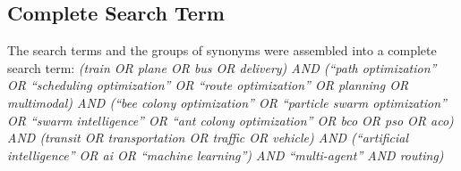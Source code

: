 
\subsection{Complete Search Term}
\label{searchterm}
The search terms and the groups of synonyms were assembled into a complete search term:
\newline
\textit{(train OR plane OR bus OR delivery) AND (``path optimization'' OR ``scheduling optimization'' OR ``route optimization'' OR planning OR multimodal) AND (``bee colony optimization'' OR ``particle swarm optimization'' OR ``swarm intelligence'' OR ``ant colony optimization'' OR bco OR pso OR aco) AND (transit OR transportation OR traffic OR vehicle) AND (``artificial intelligence'' OR ai OR ``machine learning'') AND ``multi-agent'' AND routing)}

